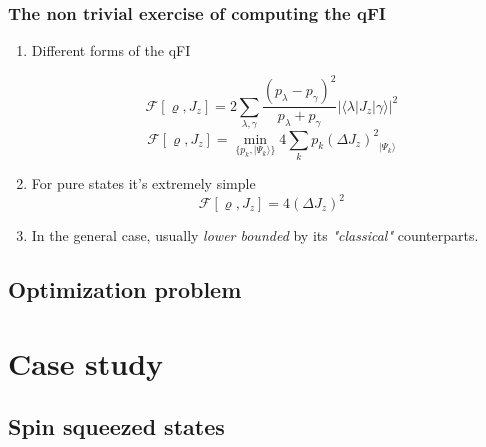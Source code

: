 \documentclass{beamer}
\newcommand{\ket}[1]{\ensuremath{\vert #1 \rangle}}
\newcommand{\braOket}[3]{\ensuremath{\langle #1 \vert #2 \vert #3 \rangle}}
\newcommand{\varian}[1]{\ensuremath{\left(\Delta #1 \right)^2}}
\begin{document}
	\begin{frame}
		\frametitle{The non trivial exercise of computing the qFI}

		\begin{enumerate}
			\item<1-> Different forms of the qFI
				\begin{block}
					{}
					\small
					\[
						\mathcal{F}[\varrho,J_z]=2 \sum_{\lambda,\gamma} \frac{(p_\lambda-p_\gamma)^2}{p_\lambda+p_\gamma} |\braOket{\lambda}{J_z}{\gamma}|^2
					\]
					\[
					  \mathcal{F}[\varrho,J_z]=\min_{\{p_k,\ket{\Psi_k}\}} 4\sum_k p_k \varian{J_z}_{\ket{\Psi_k}}
					\]
				\end{block}

			\item<2-> For pure states it's extremely simple
				{\small
				\[
					\mathcal{F}[\varrho,J_z] = 4\varian{J_z}
				\]
				}
			\item<3-> In the general case, usually \emph{\color{blue} lower bounded} by its \emph{"classical"} counterparts.

		\end{enumerate}

	\end{frame}

	\subsection{Optimization problem}

		\begin{frame}


		\end{frame}

\section{Case study}

		\begin{frame}
			\tableofcontents[currentsection]

		\end{frame}

		\begin{frame}


		\end{frame}

	\subsection{Spin squeezed states}
\end{document}
